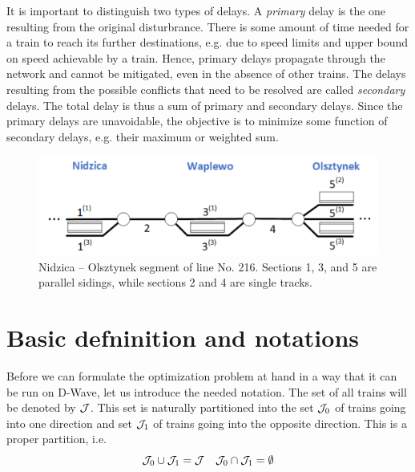 It is important to distinguish two types of delays. A \emph{primary} delay is the one resulting from
the original disturbrance. There is some amount of time needed for a train to reach its further
destinations, e.g. due to speed limits and upper bound on speed achievable by a train. Hence,
primary delays propagate through the network and cannot be mitigated, even in the absence of other
trains. The delays resulting from the possible conflicts that need to be resolved are called
\emph{secondary} delays. The total delay is thus a sum of primary and secondary delays. Since the
primary delays are unavoidable, the objective is to minimize some function of secondary delays, e.g.
their maximum or weighted sum.

\begin{figure}
    \label{fig:railway-network}
    \includegraphics[width=\textwidth]{figures/line_small.pdf}
    \caption{ Nidzica -- Olsztynek segment of line No. 216. Sections 1, 3, and 5 are parallel
        sidings, while sections 2 and 4 are single tracks. }
\end{figure}

\section{Basic defninition and notations}
Before we can formulate the optimization problem at hand in a way that it can be run on D-Wave, let
us introduce the needed notation. The set of all trains will be denoted by $\mathcal{J}$. This set is
naturally partitioned into the set $\mathcal{J}_0$ of trains going into one direction and set $\mathcal{J}_1$ of
trains going into the opposite direction. This is a proper partition, i.e.
\begin{equation}
    \mathcal{J}_0 \cup \mathcal{J}_1 = \mathcal{J} \quad \mathcal{J}_0 \cap \mathcal{J}_1 = \emptyset
\end{equation}

